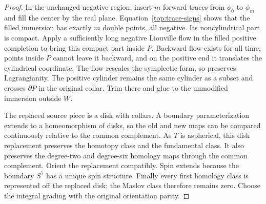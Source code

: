 \documentclass[11pt]{article}
\theoremstyle{definition}
\theoremstyle{remark}
\numberwithin{equation}{section}
\begin{document}
\begin{proof}
In the unchanged negative region, insert $m$ forward traces
from $\phi_0$ to $\phi_m$ and fill the center by the real
plane.  Equation~\eqref{top:trace-signs} shows that the filled
immersion has exactly $m$ double points, all negative.  Its
noncylindrical part is compact.  Apply a sufficiently long
negative Liouville flow in the filled positive completion to
bring this compact part inside $P$.  Backward flow exists
for all time; points inside $P$ cannot leave it backward,
and on the positive end it translates the cylindrical
coordinate.  The flow rescales the symplectic form, so
preserves Lagrangianity.  The positive cylinder remains the
same cylinder as a subset and crosses $\partial P$ in the
original collar.  Trim there and glue to the unmodified
immersion outside $W$.

The replaced source piece is a disk with collars.  A boundary
parameterization extends to a homeomorphism of disks, so the
old and new maps can be compared continuously relative to
the common complement.  As $T$ is aspherical, this disk
replacement preserves the homotopy class and the fundamental
class.  It also preserves the degree-two and degree-six
homology maps through the common complement.  Orient the
replacement compatibly.  Spin extends because the boundary
$S^7$ has a unique spin structure.  Finally every first
homology class is represented off the replaced disk; the
Maslov class therefore remains zero.  Choose the integral
grading with the original orientation parity.
\end{proof}
\end{document}
